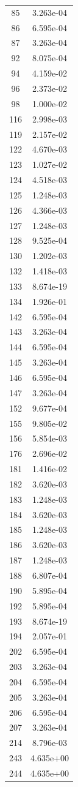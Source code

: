 \documentclass[12pt]{article}
\begin{document}
\begin{longtable}{@{}cc@{}}
85 & 3.263e-04 \\
86 & 6.595e-04 \\
87 & 3.263e-04 \\
92 & 8.075e-04 \\
94 & 4.159e-02 \\
96 & 2.373e-02 \\
98 & 1.000e-02 \\
116 & 2.998e-03 \\
119 & 2.157e-02 \\
122 & 4.670e-03 \\
123 & 1.027e-02 \\
124 & 4.518e-03 \\
125 & 1.248e-03 \\
126 & 4.366e-03 \\
127 & 1.248e-03 \\
128 & 9.525e-04 \\
130 & 1.202e-03 \\
132 & 1.418e-03 \\
133 & 8.674e-19 \\
134 & 1.926e-01 \\
142 & 6.595e-04 \\
143 & 3.263e-04 \\
144 & 6.595e-04 \\
145 & 3.263e-04 \\
146 & 6.595e-04 \\
147 & 3.263e-04 \\
152 & 9.677e-04 \\
155 & 9.805e-02 \\
156 & 5.854e-03 \\
176 & 2.696e-02 \\
181 & 1.416e-02 \\
182 & 3.620e-03 \\
183 & 1.248e-03 \\
184 & 3.620e-03 \\
185 & 1.248e-03 \\
186 & 3.620e-03 \\
187 & 1.248e-03 \\
188 & 6.807e-04 \\
190 & 5.895e-04 \\
192 & 5.895e-04 \\
193 & 8.674e-19 \\
194 & 2.057e-01 \\
202 & 6.595e-04 \\
203 & 3.263e-04 \\
204 & 6.595e-04 \\
205 & 3.263e-04 \\
206 & 6.595e-04 \\
207 & 3.263e-04 \\
214 & 8.796e-03 \\
243 & 4.635e+00 \\
244 & 4.635e+00 \\

\bottomrule
\end{longtable}
\end{document}
